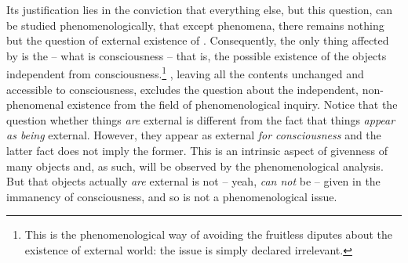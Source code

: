 Its justification lies in the conviction that 
everything else, but this question, can be studied phenomenologically, 
that except phenomena, there remains nothing but the question of 
external existence of . 
Consequently, the only thing affected by  is the 
-- what is  consciousness -- that is, the possible existence 
of the 
objects independent from consciousness.\footnote{This is the 
phenomenological way of avoiding the fruitless diputes about the 
existence of external world: the issue is 
simply declared irrelevant.} , leaving all the contents 
unchanged and accessible to consciousness, excludes the question about 
the independent,  non-phenomenal existence from the field of
 phenomenological inquiry. 
%
%
Notice that the question whether things {\em are} external is 
different from 
the fact that things {\em appear as being} external. However, 
they appear as external {\em for consciousness} and  the latter 
fact does not imply the former.
This  is an intrinsic aspect of 
givenness of many objects and, 
as such, will be observed by the phenomenological analysis. But that 
objects actually {\em are} external is not -- yeah, {\em can not} be 
-- given in the immanency of consciousness, and so is not a phenomenological issue.

